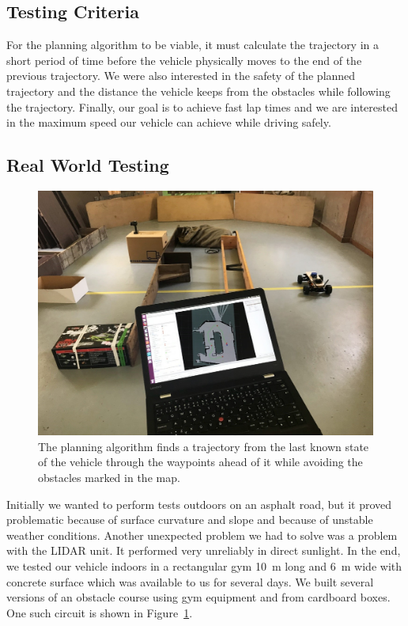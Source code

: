 \subsection{Testing Criteria}
For the planning algorithm to be viable, it must calculate the trajectory in a short period of time before the vehicle physically moves to the end of the previous trajectory. We were also interested in the safety of the planned trajectory and the distance the vehicle keeps from the obstacles while following the trajectory. Finally, our goal is to achieve fast lap times and we are interested in the maximum speed our vehicle can achieve while driving safely.

\subsection{Real World Testing}

\begin{figure}
	\centering
	\includegraphics[width=\textwidth]{../img/experiments/real-world-still.jpg}
	\caption{The planning algorithm finds a trajectory from the last known state of the vehicle through the waypoints ahead of it while avoiding the obstacles marked in the map.}
	\label{fig:real-world-testing-still}
\end{figure}


Initially we wanted to perform tests outdoors on an asphalt road, but it proved problematic because of surface curvature and slope and because of unstable weather conditions. Another unexpected problem we had to solve was a problem with the \gls*{LIDAR} unit. It performed very unreliably in direct sunlight. In the end, we tested our vehicle indoors in a rectangular gym \SI{10}{\meter} long and \SI{6}{\meter} wide with concrete surface which was available to us for several days. We built several versions of an obstacle course using gym equipment and from cardboard boxes. One such circuit is shown in Figure~\ref{fig:real-world-testing-still}.

